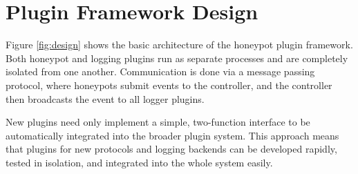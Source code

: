 \section*{\color{NavyBlue}Plugin Framework Design}

\large

\vspace{2cm}

\begin{center}
{
\scalebox{1.75}{}
}
\label{fig:design}
\end{center}

\vspace{2cm}

Figure \ref{fig:design} shows the basic architecture of the honeypot plugin
framework. Both honeypot and logging plugins run as separate processes
and are completely isolated from one another. Communication is done via a
message passing protocol, where honeypots submit events to the controller,
and the controller then broadcasts the event to all logger plugins.

New plugins need only implement a simple, two-function interface to be
automatically integrated into the broader plugin system. This approach
means that plugins for new protocols and logging backends can be developed
rapidly, tested in isolation, and integrated into the whole system easily.
